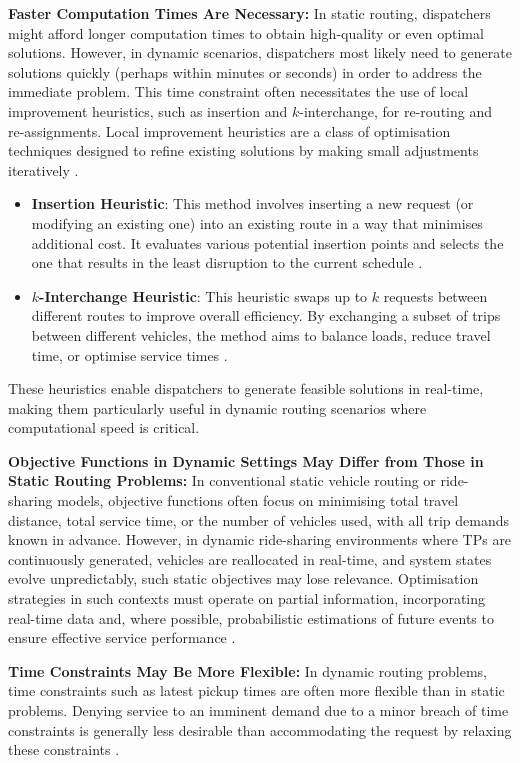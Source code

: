 \textbf{Faster Computation Times Are Necessary:} 
In static routing, dispatchers might afford longer computation times to obtain high-quality or even optimal solutions. However, in dynamic scenarios, dispatchers most likely need to generate solutions quickly (perhaps within minutes or seconds) in order to address the immediate problem. This time constraint often necessitates the use of local improvement heuristics, such as insertion and \(k\)-interchange, for re-routing and re-assignments.
Local improvement heuristics are a class of optimisation techniques designed to refine existing solutions by making small adjustments iteratively \cite{cordeau2007dial, gendreau1994tabu}.  
\begin{itemize}
    \item \textbf{Insertion Heuristic}: This method involves inserting a new request (or modifying an existing one) into an existing route in a way that minimises additional cost. It evaluates various potential insertion points and selects the one that results in the least disruption to the current schedule \cite{jaw1986heuristic}.
    \item \textbf{\(k\)-Interchange Heuristic}: This heuristic swaps up to \(k\) requests between different routes to improve overall efficiency. By exchanging a subset of trips between different vehicles, the method aims to balance loads, reduce travel time, or optimise service times \cite{potvin1993kinterchange, berbeglia2010dynamic27}.
\end{itemize}
These heuristics enable dispatchers to generate feasible solutions in real-time, making them particularly useful in dynamic routing scenarios where computational speed is critical.

\textbf{Objective Functions in Dynamic Settings May Differ from Those in Static Routing Problems:} 
In conventional static vehicle routing or ride-sharing models, objective functions often focus on minimising total travel distance, total service time, or the number of vehicles used, with all trip demands known in advance. However, in dynamic ride-sharing environments where TPs are continuously generated, vehicles are reallocated in real-time, and system states evolve unpredictably, such static objectives may lose relevance. Optimisation strategies in such contexts must operate on partial information, incorporating real-time data and, where possible, probabilistic estimations of future events to ensure effective service performance \cite{spall2003introduction}.

\textbf{Time Constraints May Be More Flexible:} 
In dynamic routing problems, time constraints such as latest pickup times are often more flexible than in static problems. Denying service to an imminent demand due to a minor breach of time constraints is generally less desirable than accommodating the request by relaxing these constraints \cite{ichoua2003vehicle}.

